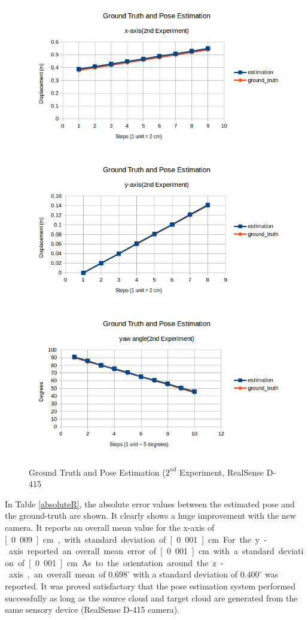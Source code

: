 \begin{figure}[htp]
\begin{center}
{
  \includegraphics[clip,width=0.7\columnwidth]{figures/x_newrealsense.png}
}
\end{center}
\begin{center}
{
  \includegraphics[clip,width=0.7\columnwidth]{figures/y_newrealsense.png}
}
\end{center}

\begin{center}
{
  \includegraphics[clip,width=0.7\columnwidth]{figures/yaw_newrealsense.png}
}
\end{center}
\caption{Ground Truth and Pose Estimation ($2^{nd}$ Experiment, RealSense D-415}
\label{newreal22}
\end{figure}

In Table \ref{absoluteR}, the absolute error values between the estimated pose and the ground-truth are shown. It clearly shows a huge improvement with the new camera. It reports an overall mean value for the x-axis of \unit[0.009] {cm},  with standard deviation of \unit[0.001] {cm}. For the y-axis reported an overall mean error of \unit[0.001] {cm} with a standard deviation of \unit[0.001] {cm}. As to the orientation around the z-axis, an overall mean of $0.698^{\circ}$ with a standard deviation of $0.400^{\circ}$ was reported. It was proved satisfactory that the pose estimation system performed successfully as long as the source cloud and target cloud are generated from the same sensory device (RealSense D-415 camera). 

